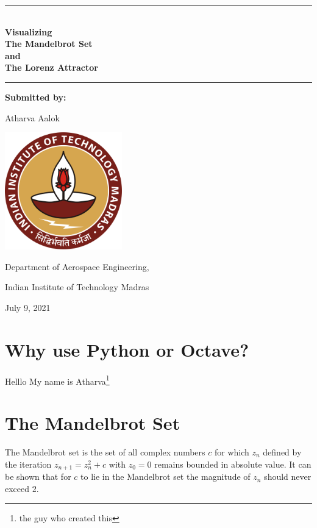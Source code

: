 \documentclass[14pts]{article}
\begin{document}
    \begin{titlepage}
        \begin{center}
            \rule{\textwidth}{1pt}\\
            \Huge
            \textbf{Visualizing \\ The Mandelbrot Set \\ and \\ The Lorenz Attractor }\\
            \rule{\textwidth}{1pt}
            \vfill
            
            \Large
            \textbf{Submitted by:}
            \medskip

            Atharva Aalok
            \vfill

            \includegraphics[width = 2in]{Images/IITM_logo.svg.png}
            \vfill

            Department of Aerospace Engineering,
            \medskip

            Indian Institute of Technology Madras
            \vfill

            July 9, 2021

        \end{center}
    \end{titlepage}


    \renewcommand*\contentsname{Summary}
    \tableofcontents

    \pagebreak
    \section{Why use Python or Octave?}
    Helllo My name is Atharva\footnote[2]{the guy who created this} \\
    \lipsum[1-2]

    \pagebreak



    \section{The Mandelbrot Set}
    The Mandelbrot set is the set of all complex numbers $ c $ for which $z_{n}$ defined by the iteration $ z_{n+1} = z_{n}^2 + c $ with $ z_{0} = 0 $ remains bounded in absolute value.
    It can be shown that for $ c $ to lie in the Mandelbrot set the magnitude of $ z_{n} $ should never exceed $ 2 $.
\end{document}

